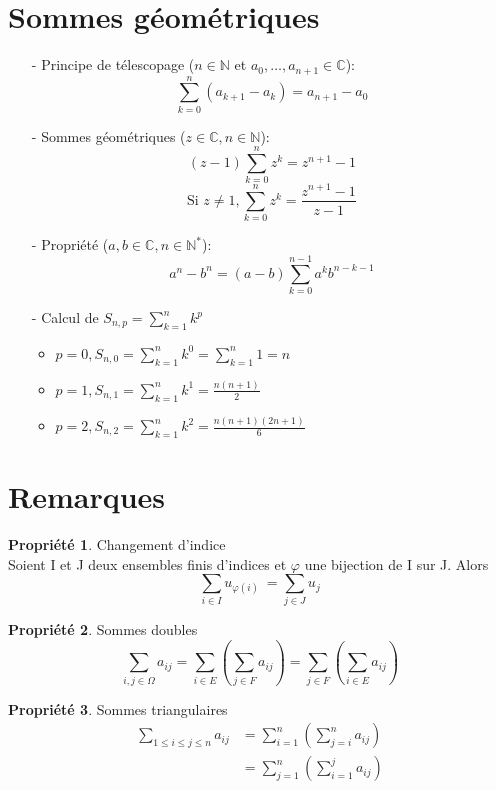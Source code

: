 \documentclass[fleqn]{article}
\theoremstyle{definition} \newtheorem*{defi}{D\'efinition}
\theoremstyle{definition} \newtheorem*{theo}{Th\'eor\`eme}
\theoremstyle{definition} \newtheorem*{prop}{Propri\'et\'e}
\begin{document}
\section{Sommes g\'eom\'etriques}
\begin{itemize}
	\item [-] Principe de t\'elescopage (\(n \in \mathbb{N}\) et \(a_0, \hdots, a_{n+1} \in \mathbb{C}\)):
		\[\sum_{k=0}^{n} (a_{k+1} - a_k) = a_{n+1} - a_0\]
	\item [-] Sommes g\'eom\'etriques (\(z \in \mathbb{C}, n \in \mathbb{N}\)):
		\[(z-1)\sum_{k=0}^{n}z^k = z^{n+1} -1\]
		\[\text{Si } z \neq 1, \sum_{k=0}^{n}z^k=\frac{z^{n+1}-1}{z-1}\]
	\item [-] Propri\'{e}t\'{e} (\(a,b \in \mathbb{C}, n \in \mathbb{N}^*\)):
		\[a^n-b^n = (a-b)\sum_{k=0}^{n-1}a^kb^{n-k-1}\]
	\item [-] Calcul de \(S_{n,p} = \sum_{k=1}^{n}k^p\)
		\begin{itemize}
			\item \(p = 0, S_{n,0} = \sum_{k=1}^{n}k^0 = \sum_{k=1}^{n}1 = n\)
			\item \(p = 1, S_{n,1} = \sum_{k=1}^{n}k^1 = \frac{n(n+1)}{2} \)
			\item \(p = 2, S_{n,2} = \sum_{k=1}^{n}k^2 = \frac{n(n+1)(2n+1)}{6} \)
		\end{itemize}
\end{itemize}

\section{Remarques}
\begin{prop} Changement d'indice\\
	Soient I et J deux ensembles finis d'indices et $\varphi$ une bijection de I sur J. Alors
	\[\underset{i \in I}{\sum} u_{\varphi(i)}\ = \underset{j \in J}{\sum} u_j\]
\end{prop}

\begin{prop} Sommes doubles
	\[\underset{i,j\in \Omega}{\sum} a_{ij} = \underset{i \in E}{\sum}\left(\underset{j \in F}{\sum}a_{ij}\right) =
	\underset{j \in F}{\sum}\left(\underset{i \in E}{\sum}a_{ij}\right)\]
\end{prop}

\begin{prop} Sommes triangulaires
	\begin{align*}
	\underset{1 \leq i \leq j \leq n}{\sum} a_{ij} &= \sum_{i=1}^{n}\left(\sum_{j = i}^n a_{ij}\right) \\
	&= \sum_{j=1}^{n}\left(\sum_{i = 1}^j a_{ij}\right)
	\end{align*}
\end{prop}
\end{document}
